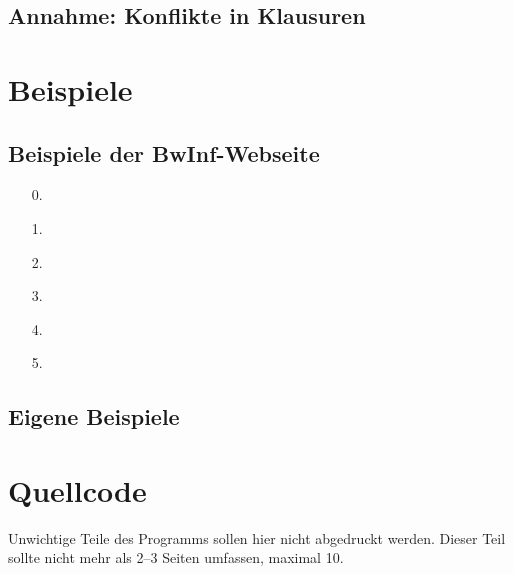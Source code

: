 \documentclass[a4paper,10pt,ngerman]{scrartcl}
\begin{document}
\subsection{Annahme: Konflikte in Klausuren}

\section{Beispiele}
\subsection{Beispiele der BwInf-Webseite}
\begin{itemize}
  \item [0.] 
  \item [1.] 
  \item [2.]
  \item [3.]
  \item [4.]
  \item [5.]
\end{itemize}
\subsection{Eigene Beispiele}

\section{Quellcode}
Unwichtige Teile des Programms sollen hier nicht abgedruckt werden. Dieser Teil sollte nicht mehr als 2–3 Seiten umfassen, maximal 10.
\end{document}
